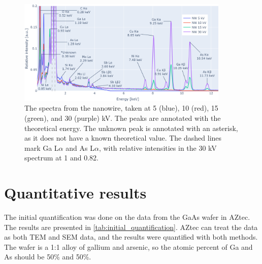 
\begin{figure}[ht!]
    \centering
    \includegraphics[width=0.90\textwidth]{figures/each_spectra/NW_everything.png}
    \caption{
        The spectra from the nanowire, taken at 5 (blue), 10 (red), 15 (green), and 30 (purple) kV.
        The peaks are annotated with the theoretical energy.
        The unknown peak is annotated with an asterisk, as it does not have a known theoretical value.
        The dashed lines mark Ga L$\alpha$ and As L$\alpha$, with relative intensities in the 30 kV spectrum at 1 and 0.82.
    }
    \label{fig:results:Spectra_NW}
\end{figure}



\newpage

\section{Quantitative results}
\label{sec:results:quantification}


The initial quantification was done on the data from the GaAs wafer in AZtec.
The results are presented in \cref{tab:initial_quantification}.
AZtec can treat the data as both TEM and SEM data, and the results were quantified with both methods.
The wafer is a 1:1 alloy of gallium and arsenic, so the atomic percent of Ga and As should be 50\% and 50\%.


